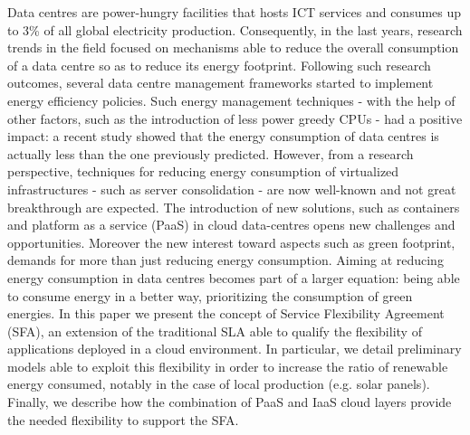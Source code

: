 

Data centres are power-hungry facilities that hosts ICT services and consumes up to 3\% of all global electricity production.
Consequently, in the last years, research trends in the field focused on mechanisms able to reduce the overall consumption of a data centre so as to reduce its energy footprint.
Following such research outcomes, several data centre management frameworks started to implement energy efficiency policies.
Such energy management techniques - with the help of other factors, such as the introduction of less power greedy CPUs - had a positive impact: a recent study showed that the energy consumption of data centres is actually less than the one previously predicted.
However, from a research perspective, techniques for reducing energy consumption of virtualized infrastructures - such as server consolidation - are now well-known and not great breakthrough are expected.
The introduction of new solutions, such as containers and platform as a service (PaaS) in cloud data-centres opens new challenges and opportunities.
Moreover the new interest toward aspects such as green footprint, demands for more than just reducing energy consumption. 
Aiming at reducing energy consumption in data centres becomes part of a larger equation: being able to consume energy in a better way, prioritizing the consumption of green energies.
In this paper we present the concept of Service Flexibility Agreement (SFA), an extension of the traditional SLA able to qualify the flexibility of applications deployed in a cloud environment.
In particular, we detail preliminary models able to exploit this flexibility in order to increase the ratio of renewable energy consumed, notably in the case of local production (e.g. solar panels).
Finally, we describe how the combination of PaaS and IaaS cloud layers provide the needed flexibility to support the SFA.
